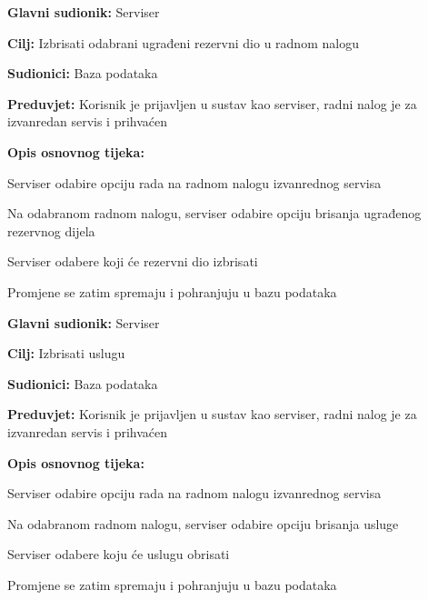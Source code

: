 \noindent {}
\begin{packed_item}
	
	\item \textbf{Glavni sudionik: } Serviser
	\item  \textbf{Cilj:} Izbrisati odabrani ugrađeni rezervni dio u radnom nalogu
	\item  \textbf{Sudionici:} Baza podataka
	\item  \textbf{Preduvjet:} Korisnik je prijavljen u sustav kao serviser, radni nalog je
	za izvanredan servis i prihvaćen
	\item  \textbf{Opis osnovnog tijeka:}
	
	\item[] \begin{packed_enum}
		
		\item Serviser odabire opciju rada na radnom nalogu izvanrednog servisa
		\item Na odabranom radnom nalogu, serviser odabire opciju brisanja ugrađenog rezervnog dijela
		\item Serviser odabere koji će rezervni dio izbrisati
		\item Promjene se zatim spremaju i pohranjuju u bazu podataka
		
	\end{packed_enum}
\end{packed_item}

\noindent {}
\begin{packed_item}
	
	\item \textbf{Glavni sudionik: } Serviser
	\item  \textbf{Cilj:} Izbrisati uslugu 
	\item  \textbf{Sudionici:} Baza podataka
	\item  \textbf{Preduvjet:} Korisnik je prijavljen u sustav kao serviser, radni nalog je
	za izvanredan servis i prihvaćen
	\item  \textbf{Opis osnovnog tijeka:}
	
	\item[] \begin{packed_enum}
		
		\item Serviser odabire opciju rada na radnom nalogu izvanrednog servisa
		\item Na odabranom radnom nalogu, serviser odabire opciju brisanja usluge
		\item Serviser odabere koju će uslugu obrisati
		\item Promjene se zatim spremaju i pohranjuju u bazu podataka
		
	\end{packed_enum}
\end{packed_item}

